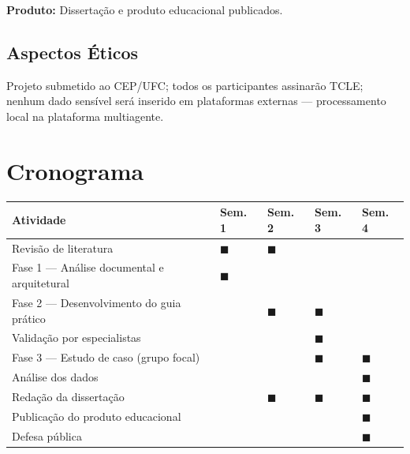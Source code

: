 \documentclass[
    12pt,
    openany,
    oneside,
    a4paper,
    brazilian
]{abntex2}
\begin{document}
\noindent\textbf{Produto:} Dissertação e produto educacional publicados.

\subsection{Aspectos Éticos}
Projeto submetido ao CEP/UFC; todos os participantes assinarão TCLE; nenhum dado sensível será inserido em plataformas externas --- processamento local na plataforma multiagente.

\section{Cronograma}

\begin{center}
\renewcommand{\arraystretch}{1.3}
\begin{tabularx}{\textwidth}{|l|X|X|X|X|}
\hline
\textbf{Atividade} & \textbf{Sem. 1} & \textbf{Sem. 2} & \textbf{Sem. 3} & \textbf{Sem. 4} \\
\hline
Revisão de literatura & $\blacksquare$ & $\blacksquare$ & & \\
\hline
Fase 1 --- Análise documental e arquitetural & $\blacksquare$ & & & \\
\hline
Fase 2 --- Desenvolvimento do guia prático & & $\blacksquare$ & $\blacksquare$ & \\
\hline
Validação por especialistas & & & $\blacksquare$ & \\
\hline
Fase 3 --- Estudo de caso (grupo focal) & & & $\blacksquare$ & $\blacksquare$ \\
\hline
Análise dos dados & & & & $\blacksquare$ \\
\hline
Redação da dissertação & & $\blacksquare$ & $\blacksquare$ & $\blacksquare$ \\
\hline
Publicação do produto educacional & & & & $\blacksquare$ \\
\hline
Defesa pública & & & & $\blacksquare$ \\
\hline
\end{tabularx}
\end{center}


\end{document}
